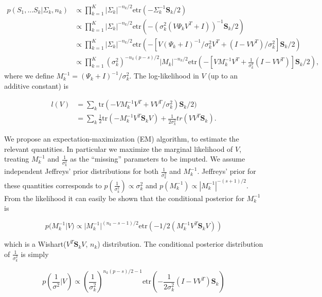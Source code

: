 \documentclass[12pt]{article}
\newcommand{\tr}{\text{tr}}
\newcommand{\etr}{\text{etr}}
\begin{document}
\begin{align}
\nonumber p(S_1, ... S_k | \Sigma_k,n_k) &\propto \prod_{k=1}^K |\Sigma_k|^{-n_k/2}\etr(-\Sigma_k^{-1}\mathbf{S}_k/2)  \\
\nonumber &\propto \prod_{k=1}^K  |\Sigma_k|^{-n_k/2}\etr(-(\sigma_k^2(V\Psi_kV^T +
  I))^{-1}\mathbf{S}_k/2) \\
\nonumber &\propto \prod_{k=1}^K  |\Sigma_k|^{-n_k/2}\etr(-\left[V(\Psi_k +
  I)^{-1}/\sigma_k^2 V^T + (I-VV^T)/\sigma^2_k\right]\mathbf{S}_k/2)
  \\
&\propto \prod_{k=1}^K  (\sigma_k^2)^{-n_k(p-s)/2}|M_k|^{-n_k/2}\etr(-\left[VM_k^{-1}V^T + \frac{1}{\sigma^2_k} (I-VV^T)\right]\mathbf{S}_k/2) ,
\end{align}
%
\noindent where we define $M_k^{-1} = (\Psi_k + I) ^{-1}/\sigma_k^2$.  The log-likelihood in
$V$ (up to an additive constant) is

\begin{align}
\nonumber l(V) &= \sum_k \tr\left(-VM_k^{-1}V^T +
       VV^T/\sigma^2_k\right)\mathbf{S}_k/2)\\
&= \sum_k \frac{1}{2}\tr\left(-M_k^{-1}V^T \mathbf{S}_kV\right) + \frac{1}{2\sigma_k^2}tr\left(VV^T \mathbf{S}_k\right).
\end{align}


We propose an expectation-maximization (EM) algorithm, to estimate the
relevant quantities.  In particular we maximize the marginal
likelihood of $V$, treating $M_k^{-1}$ and $\frac{1}{\sigma_k^2}$ as
the ``missing'' parameters to be imputed.  We assume independent
Jeffreys' prior distributions for both $\frac{1}{\sigma_k^2}$ and
$M_k^{-1}$.  Jeffreys' prior for these quantities corresponds to
$p(\frac{1}{\sigma_k^2}) \propto \sigma_k^2$ and
$p(M_k^{-1}) \propto |M_k^{-1}|^{-(s+1)/2}$.  From the likelihood it
can easily be shown that the conditional posterior for $M_k^{-1}$ is

$$p(M_k^{-1} | V) \propto |M_k^{-1}|^{(n_k - s -1)/2}\etr(-1/2(M_k^{-1}V^T\mathbf{S}_kV)) $$

\noindent which is a Wishart($V^T\mathbf{S}_kV$, $n_k$) distribution.  The
conditional posterior distribution of $\frac{1}{\sigma_k^2}$ is simply

$$p\left(\frac{1}{\sigma^2} | V\right) \propto \left(\frac{1}{\sigma_k^2}\right)^{n_k(p-s)/2-1}\etr\left(-\frac{1}{2\sigma^2_k} (I-VV^T)\mathbf{S}_k\right)  $$
\end{document}
